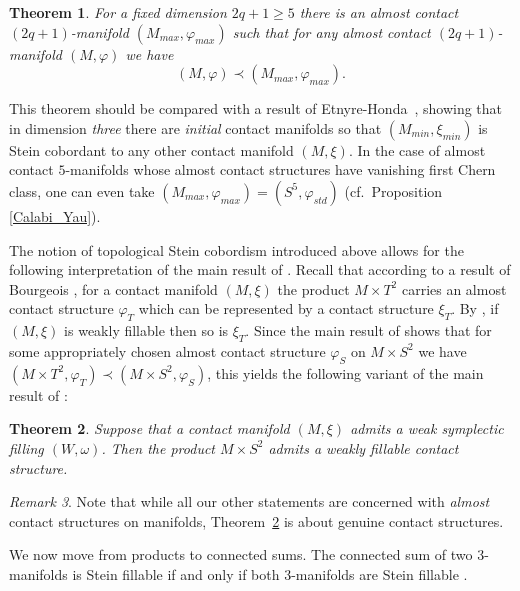 \documentclass[12pt]{amsart}
\newtheorem{Theorem}{Theorem}[section]
\theoremstyle{remark}
\newtheorem{Remark}[Theorem]{Remark}
\begin{document}
\begin{Theorem}\label{thm:maximalelement}
For a fixed dimension $2q{+}1\geq 5$ there is an almost contact
$(2q{+}1)$-manifold $(M _{max}, \varphi _{max})$ such that for any
almost contact $(2q{+}1)$-manifold $(M, \varphi )$ we have
\[
(M,\varphi ) \prec (M_{max},\varphi_{max}).
\]
\end{Theorem}
\noindent This theorem should be compared with a result of
Etnyre-Honda~\cite{EtHond}, showing that in dimension \emph{three} there are \emph{initial} contact manifolds so that $(M_{min}, \xi _{min})$ is
Stein cobordant to any other contact manifold $(M, \xi )$. In the case
of almost contact $5$-manifolds whose almost contact structures have
vanishing first Chern class, one can even take
$(M_{max},\varphi_{max}) = (S^5,\varphi_{std})$ (cf.\ Proposition
\ref{Calabi_Yau}).

The notion of topological Stein cobordism introduced above
allows for the following interpretation of the main result of \cite{BCS1}.
 Recall that according to a result of Bourgeois \cite{Bou},  
for a
contact manifold $(M, \xi )$ the product $M\times T^2$ carries an 
almost contact structure $\varphi _{T}$ which can be represented by a contact
structure $\xi _{T}$. By \cite[Example~5]{Massot12}, if $(M, \xi )$ is weakly fillable
then so is $\xi _{T}$. Since the main result of 
\cite{BCS1} shows that for some appropriately chosen almost contact structure
$\varphi _{S}$ on $M\times S^2$ we have 
$(M\times T^2,  \varphi _T) \prec (M\times S^2, \varphi _S)$, this yields
the following
variant of the main result of \cite{BCS1}:

\begin{Theorem}\label{thm:mandmtimess2}
Suppose that a contact manifold $(M, \xi )$ %
admits a weak symplectic filling $(W, \omega )$.
Then the product $M\times S^2$ admits a
weakly fillable contact structure.
\end{Theorem}

\begin{Remark}
Note that while all our other statements are concerned with 
\emph{almost} contact structures on manifolds, Theorem~\ref{thm:mandmtimess2}
is about genuine contact structures.
\end{Remark}


We now move from products to connected sums.
The connected sum of two 3-manifolds is Stein fillable if and only if
both 3-manifolds are Stein fillable \cite{Eliashberg90}. 
\end{document}
